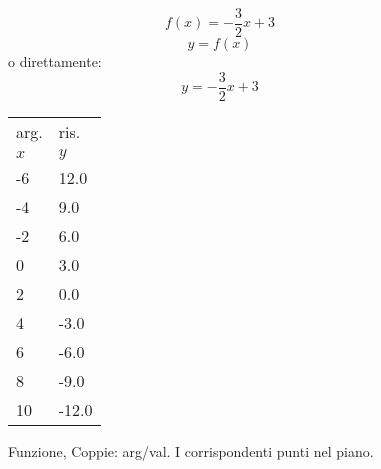 \begin{inaccessibleblock}
\begin{figure}[h]
\centering
\begin{minipage}[]{.19\textwidth}
\[f(x)=-\frac{3}{2}x+3\]
\[y=f(x)\]
o direttamente:
\[y=-\frac{3}{2}x+3\]
\vspace{2.em}
 \end{minipage}
\begin{minipage}[]{.39\textwidth}
\begin{center}
\begin{tabular}{l|l}
arg. & ris. \\
\(x\) & \(y\) \\
\hline
-6 & 12.0 \\
-4 & 9.0 \\
-2 & 6.0 \\
0 & 3.0 \\
2 & 0.0 \\
4 & -3.0 \\
6 & -6.0 \\
8 & -9.0 \\
10 & -12.0 
\end{tabular}
\end{center}
 \end{minipage}
 \begin{minipage}[]{.40\textwidth}
\puntiallineati
 \end{minipage}
  \caption{Funzione, \quad Coppie: arg/val. \quad 
  I corrispondenti punti nel piano.}
  \label{fig:puntiallineati}
\end{figure}
\end{inaccessibleblock}


